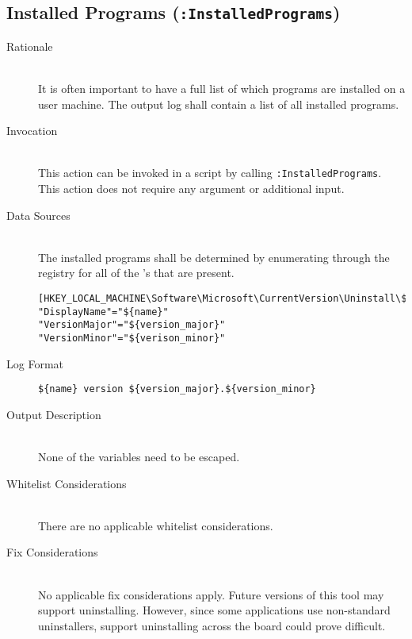 \subsection{Installed Programs (\texttt{:InstalledPrograms})}
\begin{description}
\item[Rationale] \hfill \\
It is often important to have a full list of which programs are installed on a
user machine.  The output log shall contain a list of all installed programs. 
\item[Invocation] \hfill \\
This action can be invoked in a script by calling \verb|:InstalledPrograms|.
This action does not require any argument or additional input. 
\item[Data Sources] \hfill \\
The installed programs shall be determined by enumerating through the registry
for all of the 's that are present.
\vspace{-\baselineskip}
\begin{verbatim}
[HKEY_LOCAL_MACHINE\Software\Microsoft\CurrentVersion\Uninstall\${id}]
"DisplayName"="${name}"
"VersionMajor"="${version_major}"
"VersionMinor"="${verison_minor}"
\end{verbatim}
\item[Log Format] \hfill 
\vspace{-\baselineskip}
\begin{verbatim}
${name} version ${version_major}.${version_minor}
\end{verbatim}
\item[Output Description] \hfill \\
None of the variables need to be escaped.
\item[Whitelist Considerations] \hfill \\
There are no applicable whitelist considerations.
\item[Fix Considerations] \hfill \\
No applicable fix considerations apply.  Future versions of this tool may
support uninstalling.  However, since some applications use non-standard
uninstallers, support uninstalling across the board could prove difficult.
\end{description}
